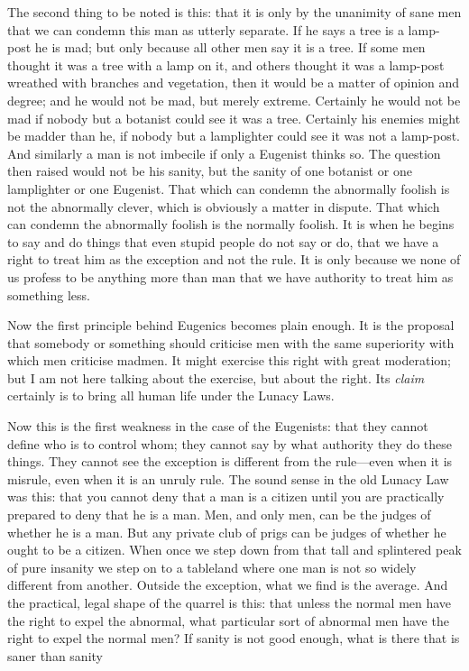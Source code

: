 \documentclass{book}
\begin{document}
The second thing to be noted is this: that it is only by the unanimity of sane men that we can condemn this man as utterly separate. If he says a tree is a lamp-post he is mad; but only because all other men say it is a tree. If some men thought it was a tree with a lamp on it, and others thought it was a lamp-post wreathed with branches and vegetation, then it would be a matter of opinion and degree; and he would not be mad, but merely extreme. Certainly he would not be mad if nobody but a botanist could see it was a tree. Certainly his enemies might be madder than he, if nobody but a lamplighter could see it was not a lamp-post. And similarly a man is not imbecile if only a Eugenist thinks so. The question then raised would not be his sanity, but the sanity of one botanist or one lamplighter or one Eugenist. That which can condemn the abnormally foolish is not the abnormally clever, which is obviously a matter in dispute. That which can condemn the abnormally foolish is the normally foolish. It is when he begins to say and do things that even stupid people do not say or do, that we have a right to treat him as the exception and not the rule. It is only because we none of us profess to be anything more than man that we have authority to treat him as something less.

Now the first principle behind Eugenics becomes plain enough. It is the proposal that somebody or something should criticise men with the same superiority with which men criticise madmen. It might exercise this right with great moderation; but I am not here talking about the exercise, but about the right. Its \emph{claim} certainly is to bring all human life under the Lunacy Laws.

Now this is the first weakness in the case of the Eugenists: that they cannot define who is to control whom; they cannot say by what authority they do these things. They cannot see the exception is different from the rule—even when it is misrule, even when it is an unruly rule. The sound sense in the old Lunacy Law was this: that you cannot deny that a man is a citizen until you are practically prepared to deny that he is a man. Men, and only men, can be the judges of whether he is a man. But any private club of prigs can be judges of whether he ought to be a citizen. When once we step down from that tall and splintered peak of pure insanity we step on to a tableland where one man is not so widely different from another. Outside the exception, what we find is the average. And the practical, legal shape of the quarrel is this: that unless the normal men have the right to expel the abnormal, what particular sort of abnormal men have the right to expel the normal men? If sanity is not good enough, what is there that is saner than sanity
\end{document}
